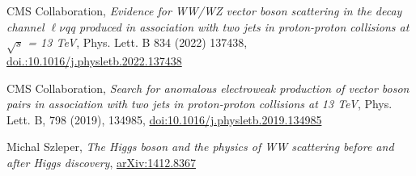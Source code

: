 {\begin{flushleft}

\end{flushleft}

\begin{thebibliography}{9}
\bibitem{[1]}
CMS Collaboration, {\em Evidence for WW/WZ vector boson scattering in the decay channel $\ell\nu$qq produced in association with two jets in proton-proton collisions at $\sqrt{s}$ = 13 TeV}, Phys. Lett. B 834 (2022) 137438, \href{https://doi.org/10.1016/j.physletb.2022.137438}{doi.:10.1016/j.physletb.2022.137438}

\bibitem{[2]}
CMS Collaboration, {\em Search for anomalous electroweak production of vector boson pairs in association with two jets in proton-proton collisions at 13 TeV}, Phys. Lett. B, 798 (2019), 134985, \href{https://doi.org/10.1016/j.physletb.2019.134985}{doi:10.1016/j.physletb.2019.134985}

\bibitem{[3]}
Michal Szleper, {\em The Higgs boson and the physics of WW scattering before and after Higgs discovery}, \href{https://arxiv.org/pdf/1412.8367}{arXiv:1412.8367}



\end{thebibliography}}
